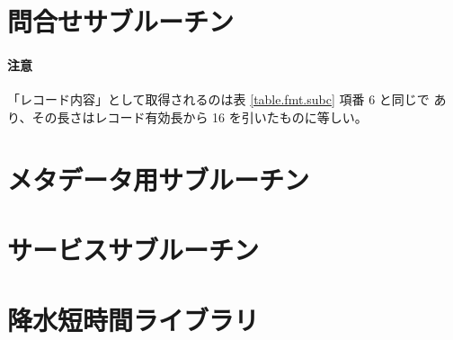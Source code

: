 

\clearpage
\section{問合せサブルーチン}










\paragraph{注意}
「レコード内容」として取得されるのは表 \ref{table.fmt.subc} 項番 6 と同じで
あり、その長さはレコード有効長から 16 を引いたものに等しい。



\clearpage
\section{メタデータ用サブルーチン}















\clearpage
\section{サービスサブルーチン}
\label{fapi:service}















\clearpage
\section{降水短時間ライブラリ}
\label{fapi:libsrf}


